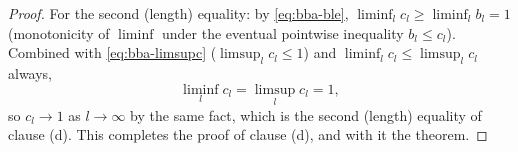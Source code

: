 \begin{proof}
  For the second (length) equality: by \eqref{eq:bba-ble}, $\liminf_l c_l \ge \liminf_l b_l = 1$
  (monotonicity of $\liminf$ under the eventual pointwise inequality $b_l\le c_l$). Combined with
  \eqref{eq:bba-limsupc} ($\limsup_l c_l\le1$) and $\liminf_l c_l\le\limsup_l c_l$ always,
  \[
    \liminf_l c_l = \limsup_l c_l = 1
    ,
  \]
  so $c_l\to1$ as $l\to\infty$ by the same fact, which is the second (length) equality of clause
  (d). This completes the proof of clause (d), and with it the theorem.
\end{proof}
